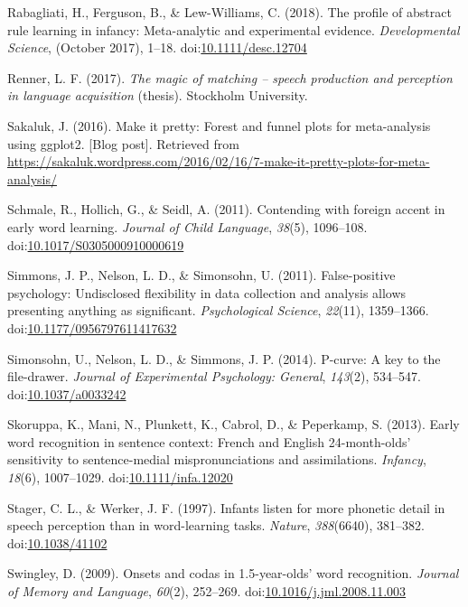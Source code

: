 \documentclass[man]{apa6}
\theoremstyle{definition}
\theoremstyle{definition}
\theoremstyle{definition}
\theoremstyle{remark}
\begin{document}
\hypertarget{ref-Rabagliati2018}{}
Rabagliati, H., Ferguson, B., \& Lew-Williams, C. (2018). The profile of
abstract rule learning in infancy: Meta-analytic and experimental
evidence. \emph{Developmental Science}, (October 2017), 1--18.
doi:\href{https://doi.org/10.1111/desc.12704}{10.1111/desc.12704}

\hypertarget{ref-Renner2017}{}
Renner, L. F. (2017). \emph{The magic of matching -- speech production
and perception in language acquisition} (thesis). Stockholm University.

\hypertarget{ref-Sakaluk2016}{}
Sakaluk, J. (2016). Make it pretty: Forest and funnel plots for
meta-analysis using ggplot2. {[}Blog post{]}. Retrieved from
\url{https://sakaluk.wordpress.com/2016/02/16/7-make-it-pretty-plots-for-meta-analysis/}

\hypertarget{ref-Schmale2011}{}
Schmale, R., Hollich, G., \& Seidl, A. (2011). Contending with foreign
accent in early word learning. \emph{Journal of Child Language},
\emph{38}(5), 1096--108.
doi:\href{https://doi.org/10.1017/S0305000910000619}{10.1017/S0305000910000619}

\hypertarget{ref-Simmons2011}{}
Simmons, J. P., Nelson, L. D., \& Simonsohn, U. (2011). False-positive
psychology: Undisclosed flexibility in data collection and analysis
allows presenting anything as significant. \emph{Psychological Science},
\emph{22}(11), 1359--1366.
doi:\href{https://doi.org/10.1177/0956797611417632}{10.1177/0956797611417632}

\hypertarget{ref-pcurve}{}
Simonsohn, U., Nelson, L. D., \& Simmons, J. P. (2014). P-curve: A key
to the file-drawer. \emph{Journal of Experimental Psychology: General},
\emph{143}(2), 534--547.
doi:\href{https://doi.org/10.1037/a0033242}{10.1037/a0033242}

\hypertarget{ref-Skoruppa2013}{}
Skoruppa, K., Mani, N., Plunkett, K., Cabrol, D., \& Peperkamp, S.
(2013). Early word recognition in sentence context: French and English
24-month-olds' sensitivity to sentence-medial mispronunciations and
assimilations. \emph{Infancy}, \emph{18}(6), 1007--1029.
doi:\href{https://doi.org/10.1111/infa.12020}{10.1111/infa.12020}

\hypertarget{ref-Stager1997}{}
Stager, C. L., \& Werker, J. F. (1997). Infants listen for more phonetic
detail in speech perception than in word-learning tasks. \emph{Nature},
\emph{388}(6640), 381--382.
doi:\href{https://doi.org/10.1038/41102}{10.1038/41102}

\hypertarget{ref-Swingley2009}{}
Swingley, D. (2009). Onsets and codas in 1.5-year-olds' word
recognition. \emph{Journal of Memory and Language}, \emph{60}(2),
252--269.
doi:\href{https://doi.org/10.1016/j.jml.2008.11.003}{10.1016/j.jml.2008.11.003}
\end{document}
